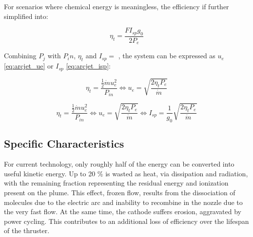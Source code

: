 For scenarios where chemical energy is meaningless, the efficiency if further simplified into:

\begin{equation}
\label{eq:arcjet_eff_3}
    \eta_t = \frac{F I_{sp} g_0}{2 P_e}
\end{equation}

Combining $P_j$ with $P_in$, $\eta_t$ and $I_{sp}=$ \cite{fep_book}, the system can be expressed as $u_e$ \eqref{eq:arcjet_ue} or $I_{sp}$ \eqref{eq:arcjet_isp}:

\begin{equation}
\label{eq:arcjet_ue}
    \eta_t = \frac{\frac{1}{2} \dot{m}u_e^2}{P_{in}} \Leftrightarrow u_e = \sqrt{\frac{2 \eta_t P_e}{\dot{m}}} 
\end{equation}


\begin{equation}
\label{eq:arcjet_isp}
    \eta_t = \frac{\frac{1}{2} \dot{m}u_e^2}{P_{in}} \Leftrightarrow u_e = \sqrt{\frac{2 \eta_t P_e}{\dot{m}}} \Leftrightarrow I_{sp} = \frac{1}{g_0} \sqrt{\frac{2 \eta_t P_e}{\dot{m}}}
\end{equation}

\subsection{Specific Characteristics}

For current technology,  only roughly half of the energy can be converted into useful kinetic energy. Up to 20 \% is wasted as heat, via dissipation and radiation, with the remaining fraction representing the residual energy and ionization present on the plume. This effect, frozen flow, results from the dissociation of molecules due to the electric arc and inability to recombine in the nozzle due to the very fast flow.  At the same time, the cathode suffers erosion, aggravated by power cycling. This contributes to an additional loss of efficiency over the lifespan of the thruster.\cite{mtp_book}


